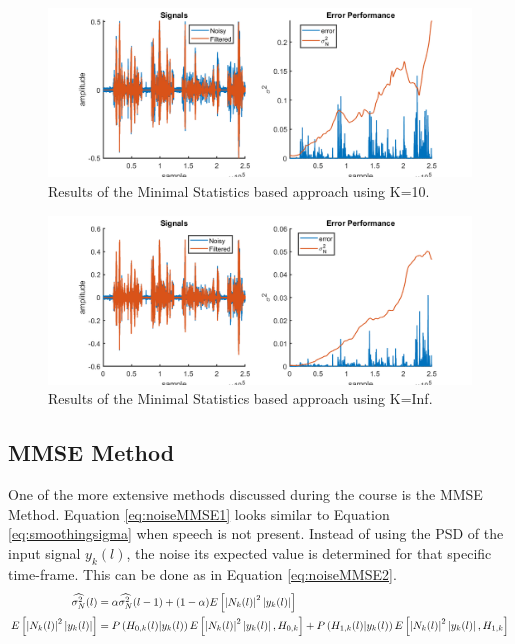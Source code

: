 \begin{figure}
  \centering
  \includegraphics[width=\textwidth]{images/MeanK10.png}
  \caption{Results of the Minimal Statistics based approach using K=10.}
  \label{fig:K10}
\end{figure}

\begin{figure}
  \centering
  \includegraphics[width=\textwidth]{images/MeanKinf.png}
  \caption{Results of the Minimal Statistics based approach using K=Inf.}
  \label{fig:KInf}
\end{figure}



\subsection{MMSE Method}
One of the more extensive methods discussed during the course is the MMSE Method. Equation \ref{eq:noiseMMSE1} looks similar to Equation \ref{eq:smoothingsigma} when speech is not present. Instead of using the PSD of the input signal $y_k(l)$, the noise its expected value is determined for that specific time-frame. This can be done as in Equation \ref{eq:noiseMMSE2}.
\begin{align}
  \widehat{\sigma_{N}^{2}}(l) &= \alpha \widehat{\sigma_{N}^{2}}(l-1) + (1-\alpha)E\left[ \abs{N_{k}(l)}^{2}\abs{y_{k}(l)}\right]
  \label{eq:noiseMMSE1} \\
  E\left[ \abs{N_{k}(l)}^{2}\abs{y_{k}(l)}\right] &=
  P\left(H_{0,k}(l)|y_{k}(l)\right) E\left[\abs{N_{k}(l)}^{2}\abs{y_{k}(l)},H_{0,k}\right] +
  P\left(H_{1,k}(l)|y_{k}(l)\right) E\left[\abs{N_{k}(l)}^{2}\abs{y_{k}(l)},H_{1,k}\right]
  \label{eq:noiseMMSE2}
\end{align}

